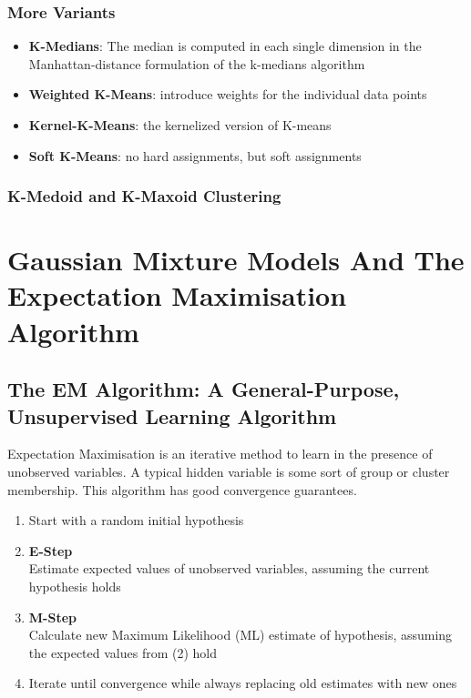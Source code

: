 \documentclass[11pt]{article}
\theoremstyle{definition}
\begin{document}
\subsubsection{More Variants}
\begin{itemize}
	\item \textbf{K-Medians}: The median is computed in each single dimension in the Manhattan-distance formulation of the k-medians algorithm
	\item \textbf{Weighted K-Means}: introduce weights for the individual data points
	\item \textbf{Kernel-K-Means}: the kernelized version of K-means
	\item \textbf{Soft K-Means}: no hard assignments, but soft assignments
\end{itemize}

\subsubsection{K-Medoid and K-Maxoid Clustering}

\section{Gaussian Mixture Models And The Expectation Maximisation Algorithm}
\subsection{The EM Algorithm: A General-Purpose, Unsupervised Learning Algorithm}
Expectation Maximisation is an iterative method to learn in the presence of unobserved variables. A typical hidden variable is some sort of group or cluster membership. This algorithm has good convergence guarantees.

\begin{enumerate}
	\item Start with a random initial hypothesis
	\item \textbf{E-Step}\\
	Estimate expected values of unobserved variables, assuming the current hypothesis holds
	\item \textbf{M-Step}\\
	Calculate new Maximum Likelihood (ML) estimate of hypothesis, assuming the expected values from (2) hold
	\item Iterate until convergence while always replacing old estimates with new ones
\end{enumerate}
\end{document}
